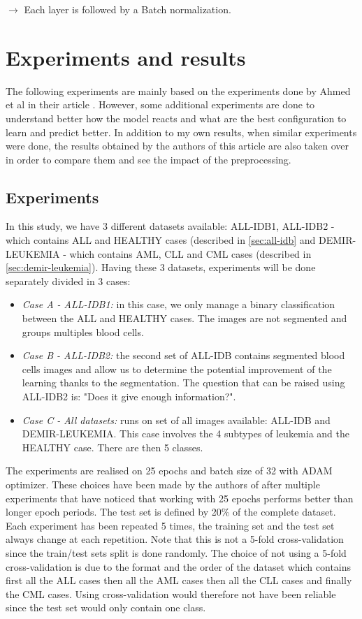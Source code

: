 \documentclass[11pt, openany]{report}
\theoremstyle{plain}
\theoremstyle{definition}
\theoremstyle{remark}
\begin{document}
$\rightarrow$ Each layer is followed by a Batch normalization. 


\section{Experiments and results}

The following experiments are mainly based on the experiments done by Ahmed et al in their article \cite{leukemia}. However, some additional experiments are done to understand better how the model reacts and what are the best configuration to learn and predict better. In addition to my own results, when similar experiments were done, the results obtained by the authors of this article are also taken over in order to compare them and see the impact of the preprocessing. 

\subsection{Experiments}

In this study, we have 3 different datasets available: ALL-IDB1, ALL-IDB2 - which contains ALL and HEALTHY cases (described in \autoref{sec:all-idb} and DEMIR-LEUKEMIA - which contains AML, CLL and CML cases (described in \autoref{sec:demir-leukemia}). Having these 3 datasets, experiments will be done separately divided in 3 cases: 

\begin{itemize}
\item \textit{Case A - ALL-IDB1:} in this case, we only manage a binary classification between the ALL and HEALTHY cases. The images are not segmented and groups multiples blood cells. 

\item \textit{Case B - ALL-IDB2:} the second set of ALL-IDB contains segmented blood cells images and allow us to determine the potential improvement of the learning thanks to the segmentation. The question that can be raised using ALL-IDB2 is: "Does it give enough information?". 

\item \textit{Case C - All datasets:} runs on set of all images available: ALL-IDB and DEMIR-LEUKEMIA. This case involves the 4 subtypes of leukemia and the HEALTHY case. There are then 5 classes. 
\end{itemize}   


The experiments are realised on 25 epochs and batch size of 32 with ADAM optimizer. These choices have been made by the authors of \cite{leukemia} after multiple experiments that have noticed that working with 25 epochs performs better than longer epoch periods. The test set is defined by 20\% of the complete dataset. Each experiment has been repeated 5 times, the training set and the test set always change at each repetition. Note that this is not a 5-fold cross-validation since the train/test sets split is done randomly. The choice of not using a 5-fold cross-validation is due to the format and the order of the dataset which contains first all the ALL cases then all the AML cases then all the CLL cases and finally the CML cases. Using cross-validation would therefore not have been reliable since the test set would only contain one class. 
\end{document}
